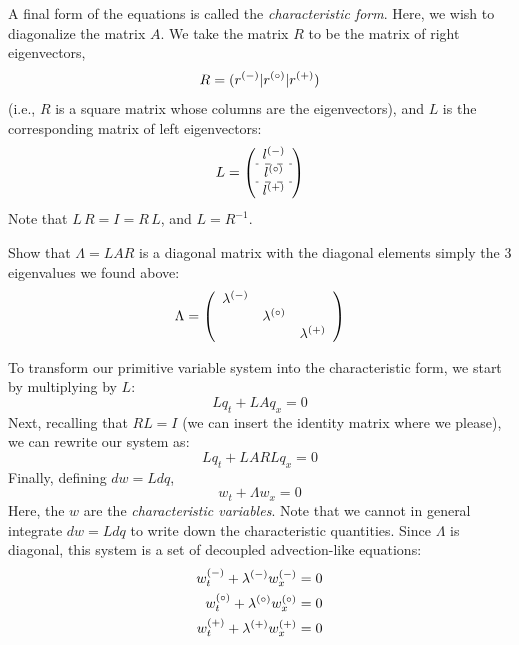 A final form of the equations is called the {\em characteristic form}.  Here,
we wish to diagonalize the matrix $A$.  We take the matrix $R$ to be the
matrix of right eigenvectors,
\begin{equation}
R = (r^{(-)} | r^{(\circ)} | r^{(+)} )
\end{equation}
(i.e., $R$ is a square matrix whose columns are the eigenvectors),
and $L$
is the corresponding matrix of left eigenvectors:
\begin{equation}
L = \left ( \begin{array}{c} l^\evm \\
                             \hdashline
                             l^\evz \\
                             \hdashline
                             l^\evp \end{array} \right )
\end{equation}
Note that $L\, R = I = R\, L$, and $L = R^{-1}$.
\begin{exercise}
{
Show that $\Lambda = L A R$ is a diagonal matrix with the diagonal elements
simply the 3 eigenvalues we found above:
\begin{equation}
\Lambda =
   \left ( \begin{array}{ccc}
             \lambda^{(-)} &              & \\
                          & \lambda^{(\circ)} & \\
                          &              & \lambda^{(+)} \end{array} \right )
\end{equation}
}
\end{exercise}
To transform our primitive variable system into the characteristic form, we 
start by multiplying by $L$:
\begin{equation}
Lq_t + L A q_x = 0
\end{equation}
Next, recalling that $RL = I$ (we can insert
the identity matrix where we please), we can rewrite our system as:
\begin{equation}
Lq_t + L A R L q_x = 0
\end{equation}
Finally, defining $dw = L dq$,
\begin{equation}
w_t + \Lambda w_x = 0
\end{equation}
Here, the $w$ are the {\em characteristic variables}.  Note that we cannot
in general integrate $dw = L dq$ to write down the characteristic
quantities.  Since $\Lambda$ is diagonal, this system is a set of
decoupled advection-like equations:
\begin{align}
w_t^{(-)} + \lambda^{(-)} w_x^{(-)} &= 0 \\
w_t^{(\circ)} + \lambda^{(\circ)} w_x^{(\circ)} &= 0 \\
w_t^{(+)} + \lambda^{(+)} w_x^{(+)} &= 0 
\end{align}

